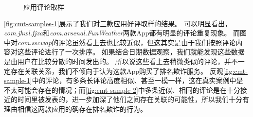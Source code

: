 \begin{figure}[htbp]
	\centering
	\hfill

	\hfill

	\hfill
    \caption{应用评论取样}
    \label{fig:cmt-samples-1}
\end{figure}

\autoref{fig:cmt-samples-1}展示了我们对三款应用好评取样的结果。
可以明显看出，\emph{com.jhwl.fjxa}和\emph{com.arsenal.FunWeather}两款App都有明显的评论重复现象。
而图中对\emph{com.sscwap}的评论虽然看上去也比较近似，但这其实是由于我们按照评论内容对这些评论进行了一次排序。
如果结合日期数据观察，我们就能发现这些数据是由用户在比较分散的时间发出的。
所以说这些看上去稍微类似的评论，并不一定存在关联关系，我们不倾向于认为这款App购买了排名欺诈服务。
反观\autoref{fig:cmt-sample-1}中的评论，有多条长评论高度相似、甚至一模一样，这在真实案例中是不太可能会存在的情况；而\autoref{fig:cmt-sample-2}中多条近似、相同的评论是在十分接近的时间里被发表的，进一步加深了他们之间存在关联的可能性，所以我们十分有理由相信这两款应用的确存在排名欺诈的行为。


